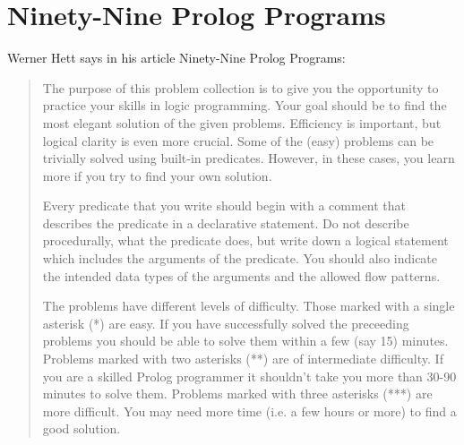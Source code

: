 \documentclass[a4paper,12pt]{book}
\begin{document}
\chapter{Ninety-Nine Prolog Programs}
Werner Hett says in his article Ninety-Nine Prolog Programs:
\begin{quotation}
	The purpose of this problem collection is to give you the
	opportunity to practice your skills in logic programming.
	Your goal should be to find the most elegant solution of
	the given problems. Efficiency is important, but logical
	clarity is even more crucial. Some of the (easy) problems
	can be trivially solved using built-in predicates. However,
	in these cases, you learn more if you try to find your own
	solution.

	Every predicate that you write should begin with a comment
	that describes the predicate in a declarative statement.
	Do not describe procedurally, what the predicate does, but
	write down a logical statement which includes the arguments
	of the predicate. You should also indicate the intended data
	types of the arguments and the allowed flow patterns.

	The problems have different levels of difficulty. Those marked
	with a single asterisk (*) are easy. If you have successfully
	solved the preceeding problems you should be able to solve
	them within a few (say 15) minutes. Problems marked with two
	asterisks (**) are of intermediate difficulty. If you are a
	skilled Prolog programmer it shouldn't take you more than
	30-90 minutes to solve them. Problems marked with three
	asterisks (***) are more difficult. You may need more
	time (i.e. a few hours or more) to find a good solution. 
\end{quotation}
\end{document}
